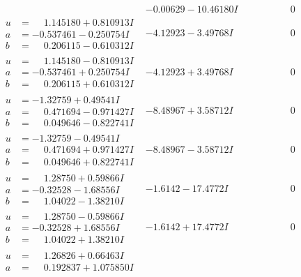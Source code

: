 \documentclass[1p]{elsarticle_modified}
\theoremstyle{definition}
\begin{document}
$$\begin{array}{c|c|c}
 & -0.00629 - 10.46180 I & \phantom{-0.000000 } 0 \\ \hline\begin{aligned}
u &= \phantom{-}1.145180 + 0.810913 I \\
a &= -0.537461 - 0.250754 I \\
b &= \phantom{-}0.206115 - 0.610312 I\end{aligned}
 & -4.12923 - 3.49768 I & \phantom{-0.000000 } 0 \\ \hline\begin{aligned}
u &= \phantom{-}1.145180 - 0.810913 I \\
a &= -0.537461 + 0.250754 I \\
b &= \phantom{-}0.206115 + 0.610312 I\end{aligned}
 & -4.12923 + 3.49768 I & \phantom{-0.000000 } 0 \\ \hline\begin{aligned}
u &= -1.32759 + 0.49541 I \\
a &= \phantom{-}0.471694 - 0.971427 I \\
b &= \phantom{-}0.049646 - 0.822741 I\end{aligned}
 & -8.48967 + 3.58712 I & \phantom{-0.000000 } 0 \\ \hline\begin{aligned}
u &= -1.32759 - 0.49541 I \\
a &= \phantom{-}0.471694 + 0.971427 I \\
b &= \phantom{-}0.049646 + 0.822741 I\end{aligned}
 & -8.48967 - 3.58712 I & \phantom{-0.000000 } 0 \\ \hline\begin{aligned}
u &= \phantom{-}1.28750 + 0.59866 I \\
a &= -0.32528 - 1.68556 I \\
b &= \phantom{-}1.04022 - 1.38210 I\end{aligned}
 & -1.6142 - 17.4772 I & \phantom{-0.000000 } 0 \\ \hline\begin{aligned}
u &= \phantom{-}1.28750 - 0.59866 I \\
a &= -0.32528 + 1.68556 I \\
b &= \phantom{-}1.04022 + 1.38210 I\end{aligned}
 & -1.6142 + 17.4772 I & \phantom{-0.000000 } 0 \\ \hline\begin{aligned}
u &= \phantom{-}1.26826 + 0.66463 I \\
a &= \phantom{-}0.192837 + 1.075850 I \\

\end{aligned}
\end{array}$$
\end{document}
